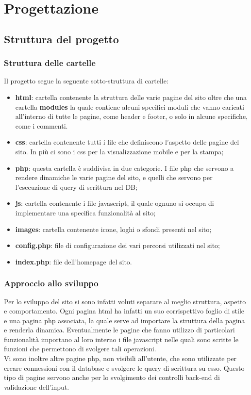 \section{Progettazione}
\label{sec:progettazione}
\subsection{Struttura del progetto}
\subsubsection{Struttura delle cartelle}
Il progetto segue la seguente sotto-struttura di cartelle:
\begin{itemize}
	\item \textbf{html}: cartella contenente la struttura delle varie pagine del sito oltre che una cartella \textbf{modules} la quale contiene alcuni specifici moduli che vanno caricati all'interno di tutte le pagine, come header e footer, o solo in alcune specifiche, come i commenti.
	\item \textbf{css}: cartella contenente tutti i file che definiscono l'aspetto delle pagine del sito. In più ci sono i css per la visualizzazione mobile e per la stampa;
	\item \textbf{php}: questa cartella è suddivisa in due categorie. I file php che servono a rendere dinamiche le varie pagine del sito, e quelli che servono per l'esecuzione di query di scrittura nel DB;
	\item \textbf{js}: cartella contenente i file javascript, il quale ognuno si occupa di implementare una specifica funzionalità al sito;
	\item \textbf{images}: cartella contenente icone, loghi o sfondi presenti nel sito; 
	\item \textbf{config.php}: file di configurazione dei vari percorsi utilizzati nel sito;
	\item \textbf{index.php}: file dell'homepage del sito.
\end{itemize}
\subsubsection{Approccio allo sviluppo}
Per lo sviluppo del sito si sono infatti voluti separare al meglio struttura, aspetto e comportamento. Ogni pagina html ha infatti un suo corrispettivo foglio di stile e una pagina php associata, la quale serve ad importare la struttura della pagina e renderla dinamica. Eventualmente le pagine che fanno utilizzo di particolari funzionalità importano al loro interno i file javascript nelle quali sono scritte le funzioni che permettono di svolgere tali operazioni.\\
Vi sono inoltre altre pagine php, non visibili all'utente, che sono utilizzate per creare connessioni con il database e svolgere le query di scrittura su esso. Questo tipo di pagine servono anche per lo svolgimento dei controlli back-end di validazione dell'input.

